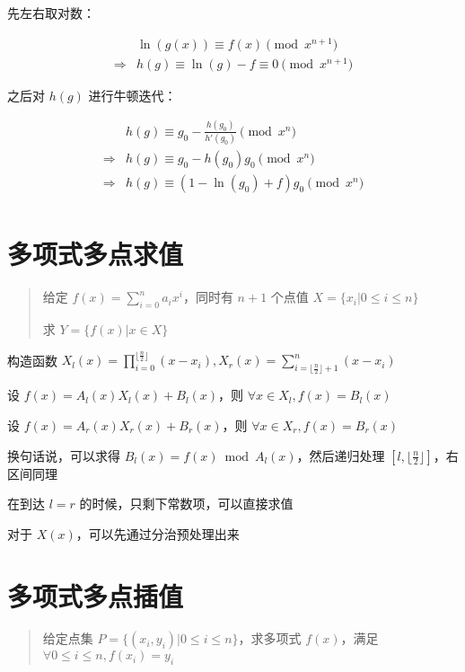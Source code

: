 \documentclass[UTF8]{article}
\begin{document}
先左右取对数：

$$
\begin{aligned}
& \ln(g(x)) \equiv f(x) \pmod {x^{n+1}} \\
\Rightarrow
&h(g) \equiv \ln(g)-f \equiv 0\pmod  {x^{n+1}}
\end{aligned}
$$

之后对 $h(g)$ 进行牛顿迭代：

$$
\begin{aligned}
& h(g) \equiv g_0-\frac{h(g_0)}{h'(g_0)} \pmod {x^{n}} \\
\Rightarrow 
& h(g) \equiv g_0-h(g_0)g_0 \pmod {x^{n}} \\
\Rightarrow 
& h(g) \equiv (1-\ln(g_0)+f)g_0\pmod {x^{n}} \\
\end{aligned}
$$

\section{多项式多点求值}

\begin{quotation}
    给定 $f(x)=\sum_{i=0}^{n}a_ix^i$，同时有 $n+1$ 个点值 $X=\{x_i | 0 \le i \le n\}$
    
    求 $Y=\{f(x) | x \in X\}$
\end{quotation}

构造函数 $X_l(x)=\prod_{i=0}^{\lfloor \frac{n}{2} \rfloor}(x-x_i),X_r(x)=\sum_{i=\lfloor \frac{n}{2} \rfloor+1}^{n}(x-x_i)$

设 $f(x)=A_l(x)X_l(x)+B_l(x)$，则 $\forall x \in X_l,f(x)=B_l(x)$

设 $f(x)=A_r(x)X_r(x)+B_r(x)$，则 $\forall x \in X_r,f(x)=B_r(x)$

换句话说，可以求得 $B_l(x)=f(x) \bmod A_l(x)$，然后递归处理 $[l,\lfloor \frac{n}{2} \rfloor]$，右区间同理

在到达 $l=r$ 的时候，只剩下常数项，可以直接求值

对于 $X(x)$，可以先通过分治预处理出来

\section{多项式多点插值}

\begin{quotation}
    给定点集 $P=\{(x_i,y_i) | 0 \le i \le n\}$，求多项式 $f(x)$，满足 $\forall 0 \le i \le n, f(x_i)=y_i$
\end{quotation}
\end{document}
